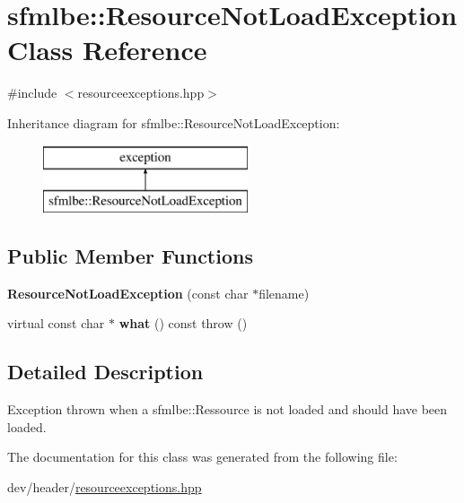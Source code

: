 \hypertarget{classsfmlbe_1_1_resource_not_load_exception}{}\section{sfmlbe\+:\+:Resource\+Not\+Load\+Exception Class Reference}
\label{classsfmlbe_1_1_resource_not_load_exception}


{\ttfamily \#include $<$resourceexceptions.\+hpp$>$}

Inheritance diagram for sfmlbe\+:\+:Resource\+Not\+Load\+Exception\+:\begin{figure}[H]
\begin{center}
\leavevmode
\includegraphics[height=2.000000cm]{classsfmlbe_1_1_resource_not_load_exception}
\end{center}
\end{figure}
\subsection*{Public Member Functions}
\begin{DoxyCompactItemize}
\item 
\mbox{\label{classsfmlbe_1_1_resource_not_load_exception_adf8ded3c4b7fd9711064f737970bdf49}} 
{\bfseries Resource\+Not\+Load\+Exception} (const char $\ast$filename)
\item 
\mbox{\label{classsfmlbe_1_1_resource_not_load_exception_a9c444cf9637f07bf7b80353f9a2032d9}} 
virtual const char $\ast$ {\bfseries what} () const  throw ()
\end{DoxyCompactItemize}


\subsection{Detailed Description}
Exception thrown when a sfmlbe\+::\+Ressource is not loaded and should have been loaded. 

The documentation for this class was generated from the following file\+:\begin{DoxyCompactItemize}
\item 
dev/header/\mbox{\hyperlink{resourceexceptions_8hpp}{resourceexceptions.\+hpp}}\end{DoxyCompactItemize}
